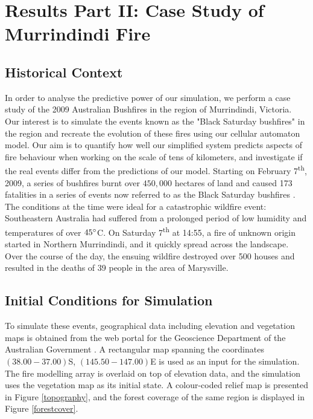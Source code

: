 \newpage

\section{Results Part II: Case Study of Murrindindi Fire}\label{results_2}

\subsection{Historical Context}

In order to analyse the predictive power of our simulation, we perform a case study of the 2009 Australian Bushfires in the region of Murrindindi, Victoria. Our interest is to simulate the events known as the "Black Saturday bushfires" in the region and recreate the evolution of these fires using our cellular automaton model. Our aim is to quantify how well our simplified system predicts aspects of fire behaviour when working on the scale of tens of kilometers, and investigate if the real events differ from the predictions of our model.\newline
\indent Starting on February 7\textsuperscript{th}, 2009, a series of bushfires burnt over $450,000$ hectares of land and caused 173 fatalities in a series of events now referred to as the Black Saturday bushfires \cite{RoyalCommission}. The conditions at the time were ideal for a catastrophic wildfire event: Southeastern Australia had suffered from a prolonged period of low humidity and temperatures of over $45\degree$C. On Saturday 7\textsuperscript{th} at 14:55, a fire of unknown origin started in Northern Murrindindi, and it quickly spread across the landscape. Over the course of the day, the ensuing wildfire destroyed over 500 houses and resulted in the deaths of 39 people in the area of Marysville.
\subsection{Initial Conditions for Simulation}
\indent To simulate these events, geographical data including elevation and vegetation maps is obtained from the web portal for the Geoscience Department of the Australian Government \cite{Geodata}. A rectangular map spanning the coordinates  $(38.00 -37.00)$\degree S, $(145.50 - 147.00)$\degree E is used as an input for the simulation. The fire modelling array is overlaid on top of elevation data, and the simulation uses the vegetation map as its initial state. A colour-coded relief map is presented in Figure \ref{topography}, and the forest coverage of the same region is displayed in Figure \ref{forestcover}.

